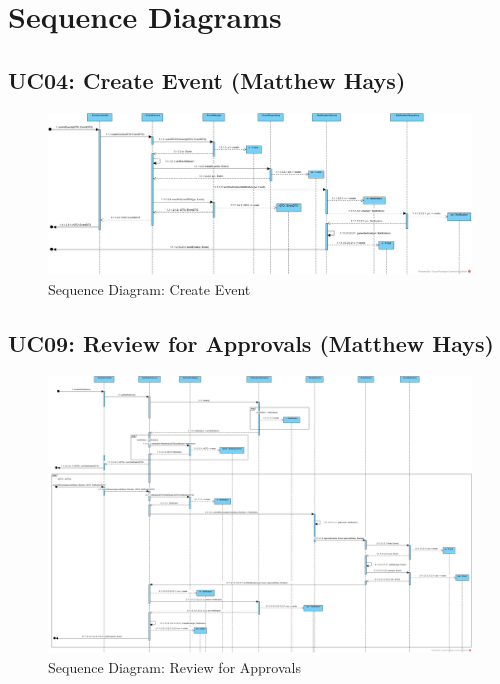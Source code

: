 \documentclass{article}
\begin{document}
\section{Sequence Diagrams}
\subsection{UC04: Create Event (Matthew Hays)}
\begin{figure}[H]
    \centering
    \includegraphics[width=.98\textwidth]{images/SD-UC04-CreateEvent.png}
    \centering
    \caption{Sequence Diagram: Create Event}
\end{figure}
\subsection{UC09: Review for Approvals (Matthew Hays)}
\begin{figure}[H]
    \centering
    \includegraphics[width=.98\textwidth]{images/SD-UC09-ReviewForApproval.png}
    \centering
    \caption{Sequence Diagram: Review for Approvals}
\end{figure}
\end{document}

